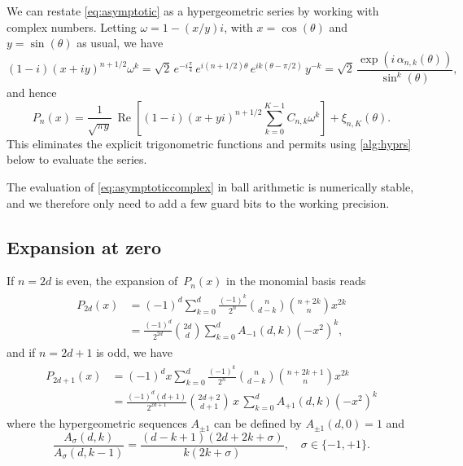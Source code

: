 \documentclass[nohypdvips,review]{siamart0216}
\begin{document}
We can restate \cref{eq:asymptotic} as a hypergeometric series
by working with complex numbers.
Letting $\omega = 1 - (x/y) i$, with $x = \cos(\theta)$ and $y =
\sin(\theta)$ as usual, we have
\[ (1-i) (x+iy)^{n+1/2} \omega^k
= \sqrt2 \, e^{-i \frac{\pi}{4}} \, e^{i (n+1/2)\theta} \,
  e^{i k (\theta-\pi/2)} \, y^{-k}
= \sqrt2 \, \frac{\exp(i \, \alpha_{n,k}(\theta))}{\sin^k(\theta)}, \]
and hence
\begin{equation}
\label{eq:asymptoticcomplex}
P_n(x) = \frac{1}{\sqrt{\pi y}} \, \operatorname{Re}\left[
(1-i) (x+y i)^{n+1/2}
\sum_{k=0}^{K-1} C_{n,k} \omega^k\right] + \xi_{n,K}(\theta).
\end{equation}
This eliminates the explicit trigonometric functions and permits using
\cref{alg:hyprs} below to evaluate the series.

The evaluation of \cref{eq:asymptoticcomplex} in ball arithmetic
is numerically stable, and we therefore only need to add a few
guard bits to the working precision.

\subsection{Expansion at zero}

\label{sec:series-zero}

If $n = 2d$ is even, the expansion of $P_n(x)$ in the monomial basis
reads
\begin{align}
\label{eq:pzeroseries0}
\begin{split}
P_{2d}(x) &= (-1)^d \sum_{k=0}^d \frac{(-1)^k}{2^n} {n \choose d-k} {n+2k \choose n} x^{2k} \\
&= \frac{(-1)^d}{2^{2d}} {2d \choose d} \sum_{k=0}^d A_{-1}(d,k) (-x^2)^k,
\end{split}
\end{align}
and if $n = 2d+1$ is odd, we have
\begin{align}
\label{eq:pzeroseries1}
\begin{split}
P_{2d+1}(x) &= (-1)^d x \sum_{k=0}^d \frac{(-1)^k}{2^n} {n \choose d-k} {n+2k+1 \choose n} x^{2k} \\
&= \frac{(-1)^d (d+1)}{2^{2d+1}} {2d+2 \choose d+1} \,x\, \sum_{k=0}^d A_{+1}(d,k) (-x^2)^k
\end{split}
\end{align}
where the hypergeometric sequences $A_{\pm1}$ can be defined by
$A_{\pm 1}(d,0) = 1$ and
\begin{equation}
\label{eq:pzerorec}
\frac{A_{\sigma}(d,k)}{A_{\sigma}(d,k-1)} = \frac{(d-k+1) (2d+2k+\sigma)}{k (2k+\sigma)}, \quad \sigma \in \{-1,+1\}.
\end{equation}
\end{document}
